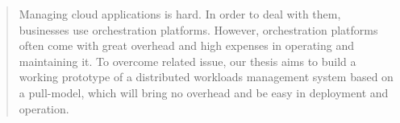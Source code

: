 \begin{abstract}

Managing cloud applications is hard. In order to deal with them, businesses use orchestration platforms. However, orchestration platforms often come with great overhead and high expenses in operating and maintaining it. To overcome related issue, our thesis aims to build a working prototype of a distributed workloads management system based on a pull-model, which will bring no overhead and be easy in deployment and operation.

\end{abstract}